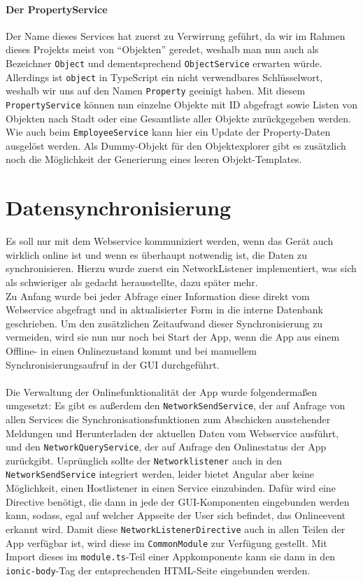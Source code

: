 \documentclass[12pt]{article}
\begin{document}
\paragraph{Der PropertyService} Der Name dieses Services hat zuerst zu Verwirrung geführt, da wir im Rahmen dieses Projekts meist von ``Objekten'' geredet, weshalb man nun auch als Bezeichner \texttt{Object} und dementsprechend \texttt{ObjectService} erwarten würde. Allerdings ist \texttt{object} in TypeScript ein nicht verwendbares Schlüsselwort, weshalb wir uns auf den Namen \texttt{Property} geeinigt haben. Mit diesem \texttt{PropertyService} können nun einzelne Objekte mit ID abgefragt sowie Listen von Objekten nach Stadt oder eine Gesamtliste aller Objekte zurückgegeben werden. Wie auch beim \texttt{EmployeeService} kann hier ein Update der Property-Daten ausgelöst werden. Als Dummy-Objekt für den Objektexplorer gibt es zusätzlich noch die Möglichkeit der Generierung eines leeren Objekt-Templates.

\section{Datensynchronisierung}
Es soll nur mit dem Webservice kommuniziert werden, wenn das Gerät auch wirklich online ist und wenn es überhaupt notwendig ist, die Daten zu synchronisieren. Hierzu wurde zuerst ein NetworkListener implementiert, was sich als schwieriger als gedacht herausstellte, dazu später mehr.\\
Zu Anfang wurde bei jeder Abfrage einer Information diese direkt vom Webservice abgefragt und in aktualisierter Form in die interne Datenbank geschrieben. Um den zusätzlichen Zeitaufwand dieser Synchronisierung zu vermeiden, wird sie nun nur noch bei Start der App, wenn die App aus einem Offline- in einen Onlinezustand kommt und bei manuellem Synchronisierungsaufruf in der GUI durchgeführt. 

\paragraph{}
Die Verwaltung der Onlinefunktionalität der App wurde folgendermaßen umgesetzt: Es gibt es außerdem den \texttt{NetworkSendService}, der auf Anfrage von allen Services die Synchronisationsfunktionen zum Abschicken ausstehender Meldungen und Herunterladen der aktuellen Daten vom Webservice ausführt, und den \texttt{NetworkQueryService}, der auf Anfrage den Onlinestatus der App zurückgibt. Usprünglich sollte der \texttt{Networklistener} auch in den \texttt{NetworkSendService} integriert werden, leider bietet Angular aber keine Möglichkeit, einen Hostlistener in einen Service einzubinden. Dafür wird eine Directive benötigt, die dann in jede der GUI-Komponenten eingebunden werden kann, sodass, egal auf welcher Appseite der User sich befindet, das Onlineevent erkannt wird. Damit diese \texttt{NetworkListenerDirective} auch in allen Teilen der App verfügbar ist, wird diese im \texttt{CommonModule} zur Verfügung gestellt. Mit Import dieses im \texttt{module.ts}-Teil einer Appkomponente kann sie dann in den \texttt{ionic-body}-Tag der entsprechenden HTML-Seite eingebunden werden.
\end{document}
